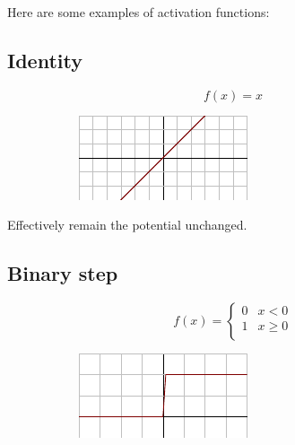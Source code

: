 \noindent
Here are some examples of activation functions\cite{activation_list}:

\subsection*{Identity}

\begin{figure}[H]
\raggedright
\begin{subfigure}{.25\textwidth}
  \centering
  \[ f(x) = x \]
\end{subfigure}%
\begin{subfigure}{.25\textwidth}
  \centering
  \includegraphics[width=\textwidth]{tex/images/activation/identity}
\end{subfigure}
\end{figure}

\noindent
Effectively remain the potential unchanged. 

\subsection*{Binary step}

\begin{figure}[H]
\raggedright
\begin{subfigure}{.35\textwidth}
  \centering
   \[
f(x) = \begin{cases}
       0 & x < 0 \\
       1 & x \geq 0 \\
     \end{cases} \]
\end{subfigure}%
\begin{subfigure}{.25\textwidth}
  \centering
  \includegraphics[width=\textwidth]{tex/images/activation/binstep}
\end{subfigure}
\end{figure}

